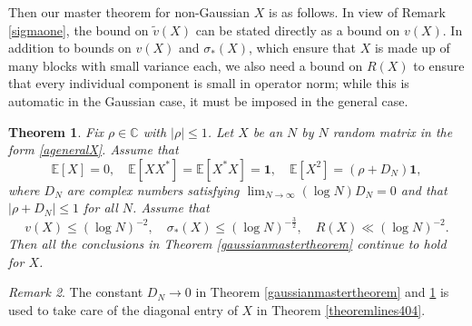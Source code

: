 \documentclass[11pt,reqno]{amsart}
\theoremstyle{plain}
\newtheorem{theorem}{Theorem}[section]
\theoremstyle{remark}
\newtheorem{remark}[theorem]{Remark}
\numberwithin{equation}{section}
\begin{document}
Then our master theorem for non-Gaussian $X$ is as follows. In view of Remark \ref{sigmaone}, the bound on $\widetilde v(X)$ can be stated directly as a bound on $v(X)$. In addition to bounds on $v(X)$ and $\sigma_*(X)$, which ensure that $X$ is made up of many blocks with small variance each, we also need a bound on $R(X)$ to ensure that every individual component is small in operator norm; while this is automatic in the Gaussian case, it must be imposed in the general case.

\begin{theorem}\label{nongaussianmastertheorem}
    Fix $\rho\in\mathbb{C}$ with $|\rho|\leq 1$. Let $X$ be an $N$ by $N$ random matrix in the form \eqref{ageneralX}. Assume that  $$\mathbb{E}[X]=0,\quad \mathbb{E}[XX^*]=\mathbb{E}[X^*X]=\mathbf{1},\quad \mathbb{E}[X^2]=(\rho+D_N)\mathbf{1},$$ where $D_N$ are complex numbers satisfying $\lim_{N\to\infty}(\log N)D_N=0$ and that $|\rho+D_N|\leq 1$ for all $N$. Assume that $$v(X)\leq (\log N)^{-2},\quad \sigma_*(X)\leq (\log N)^{-\frac{3}{2}},\quad R(X)\ll(\log N)^{-2}.$$ Then all the conclusions in Theorem \ref{gaussianmastertheorem} continue to hold for $X$.
\end{theorem}


\begin{remark}
    The constant $D_N\to 0$ in Theorem \ref{gaussianmastertheorem} and \ref{nongaussianmastertheorem} is used to take care of the diagonal entry of $X$ in Theorem \ref{theoremlines404}. 
\end{remark}
\end{document}
